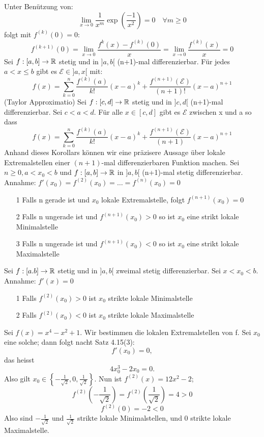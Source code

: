 Unter Benützung von:
\[ \lim_{x \rightarrow 0} \frac{1}{x^m} \exp \left( \frac{-1}{x^2}\right) = 0 \quad \forall m \geq 0\]
folgt mit \( f^{(k)}(0) = 0:\)
\[ f^{(k+1)}(0) = \lim_{x \rightarrow 0} \frac{f^{k}(x) - f^{(k)}(0)}{x} = \lim_{x \rightarrow 0} \frac{f^{(k)}(x)}{x} = 0\]
\Satz[4.43] Sei \(f: [a,b] \rightarrow \mathbb{R}\) stetig und in \(]a,b[\) \newline (n+1)-mal differenzierbar. Für jedes \(a < x \leq b \) gibt es \(\mathcal{E} \in ]a,x[ \) mit:
\[ f(x) = \sum_{k=0}^n \frac{f^{(k)}(a)}{k!}(x -a)^k + \frac{f^{(n+1)}(\mathcal{E})}{(n+1)!}(x - a)^{n+1} \]
\Korollar[4.44] (Taylor Approximatio)
Sei \(f : [c,d] \rightarrow \mathbb{R} \) stetig und in \(]c,d[ \) (n+1)-mal differenzierbar. Sei \( c < a < d\). Für alle \(x \in [c,d]\) gibt es \( \mathcal{E}\) zwischen x und a so dass
\[f(x) = \sum_{k=0}^n \frac{f^{(k)}(a)}{k!} (x-a)^k + \frac{f^{(n+1)}(\mathcal{E})}{(n+1)} (x-a)^{n+1}\]
Anhand dieses Korollars können wir eine präzisere Aussage über lokale Extremalstellen einer \((n+1)\)-mal differenzierbaren Funktion machen.
\Korollar[4.45] Sei \( n \geq 0,  a < x_0 < b \) und \(f: [a,b] \rightarrow \mathbb{R}\) in \(]a,b[\) (n+1)-mal stetig differenzierbar. Annahme: \(f'(x_0) = f^{(2)}(x_0) = \dots = f^{(n)}(x_0) = 0\)
\begin{enumerate}
    \item [1] Falls n gerade ist und \(x_0\) lokale Extremalstelle, folgt \(f^{(n+1)}(x_0) = 0\)
    \item [2] Falls n ungerade ist und \(f^{(n+1)}(x_0) > 0\) so ist \(x_0\) eine strikt lokale Minimalstelle
    \item [3] Falls n ungerade ist und \(f^{(n+1)}(x_0) < 0\) so ist \(x_0\) eine strikt lokale Maximalstelle
\end{enumerate}
\Korollar[4.46] Sei \(f : [a.b] \rightarrow \mathbb{R} \) stetig und in \(]a,b[\) zweimal stetig differenzierbar. Sei \(x < x_0 < b\). Annahme: \(f'(x) = 0\)
\begin{enumerate}
    \item [1] Falls \(f^{(2)}(x_0) > 0\) ist \(x_0\) strikte lokale Minimalstelle
    \item [2] Falls \(f^{(2)}(x_0) < 0\) ist \(x_0\) strikte lokale Maximalstelle
\end{enumerate}
\Bsp[4.47] Sei \(f(x) = x^4 - x^2 +1\). Wir bestimmen die lokalen Extremalstellen von f. Sei \(x_0\) eine solche; dann folgt nacht Satz 4.15(3):
\[f'(x_0) = 0, \]
das heisst
\[ 4x_0^3 - 2x_0 = 0.\]
Also gilt \(x_0 \in \left\{ -\frac{1}{\sqrt{2}}, 0, \frac{1}{\sqrt{2}}\right\}\). Nun ist \newline \( f^{(2)}(x) = 12x^2 - 2\);
\[ f^{(2)} \left( -\frac{1}{\sqrt{2}}\right) = f^{(2)}\left( \frac{1}{\sqrt{2}}\right) = 4 > 0\]
\[ f^{(2)}(0) = -2 < 0\]
Also sind \( -\frac{1}{\sqrt{2}}\) und \( \frac{1}{\sqrt{2}}\) strikte lokale Minimalstellen, und 0 strikte lokale Maximalstelle.